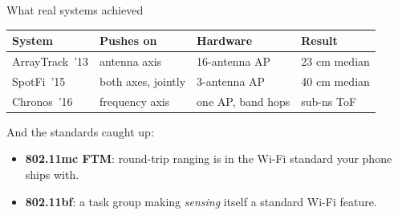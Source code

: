 \begin{frame}{What real systems achieved}
  \vspace{0.3em}
  \centering
  {\small\setlength{\tabcolsep}{4.5pt}
  \begin{tabular}{llll}
    \toprule
    System & Pushes on & Hardware & Result \\
    \midrule
    ArrayTrack\ '13 & \textcolor{ranblue}{antenna axis} &
      16-antenna AP & 23 cm median \\[2pt]
    SpotFi\ '15 & \textcolor{ranblue}{both} \textcolor{coreorange}{axes},
      jointly & 3-antenna AP & 40 cm median \\[2pt]
    Chronos\ '16 & \textcolor{coreorange}{frequency axis} &
      one AP, band hops & sub-ns ToF \\
    \bottomrule
  \end{tabular}\par}

  \vspace{0.6em}
  {\small And the standards caught up:\par}
  {\small
   \begin{itemize}\itemsep3pt
     \item \textbf{802.11mc FTM}: round-trip ranging is in the Wi-Fi standard
       your phone ships with.
     \item \textbf{802.11bf}: a task group making \emph{sensing} itself a
       standard Wi-Fi feature.
   \end{itemize}\par}

\end{frame}
